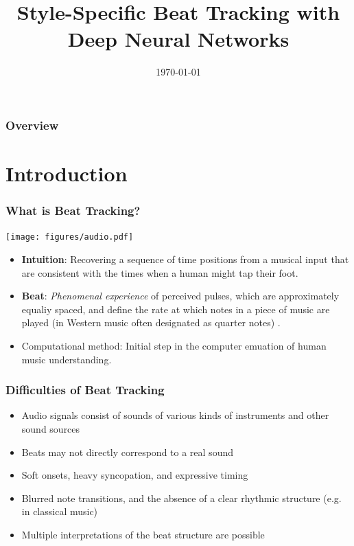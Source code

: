 \documentclass{beamer}
\title[Style-Specific Beat Tracking with DNNs]{Style-Specific Beat Tracking with \\Deep Neural Networks}
\author{Julius Richter \texorpdfstring \newline \texorpdfstring \newline \tiny julius.marius.richter@googlemail.com \texorpdfstring \newline \texorpdfstring \url{https://github.com/julius-richter/beat\_tracker}}
\institute{Technische Universität Berlin\\ Audio Communication Group}
\date{\today}
\begin{document}
\maketitle


\begin{frame}
\frametitle{Overview}
\tableofcontents
\end{frame}




\section{Introduction}

\begin{frame}
\frametitle{What is Beat Tracking?}
\begin{minipage}{\textwidth} 
\centering
\texttt{[image: figures/audio.pdf]}
\end{minipage}
\hfill
\begin{itemize}
\item \textbf{Intuition}: Recovering a sequence of time positions from a musical input that are consistent with the times when a human might tap their foot.
\item \textbf{Beat}: \emph{Phenomenal experience} of perceived pulses, which are approximately equaliy spaced, and define the rate at which notes in a piece of music are played (in Western music often designated as quarter notes) \cite{Handel1989}.
\item Computational method: Initial step in the computer emuation of human music understanding.
\end{itemize}
\end{frame}



\begin{frame}
\frametitle{Difficulties of Beat Tracking}
\centering
{}
\vfill
\begin{itemize}
\item Audio signals consist of sounds of various kinds of instruments and other sound sources
\item Beats may not directly correspond to a real sound
\item Soft onsets, heavy syncopation, and expressive timing
\item Blurred note transitions, and the absence of a clear rhythmic structure (e.g. in classical music)
\item Multiple interpretations of the beat structure are possible
\end{itemize}
\end{frame}
\end{document}
